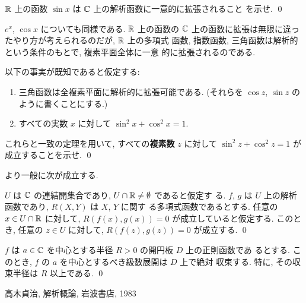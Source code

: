\documentclass[12pt,twoside]{jarticle}
\begin{document}
\begin{question}
  ${\mathbb R}$ 上の函数 $\sin x$ は ${\mathbb C}$ 上の解析函数に一意的に拡張されること
  を示せ. \qed
\end{question}

\noindent $e^x$, $\cos x$ についても同様である. ${\mathbb R}$ 上の函数の ${\mathbb C}$ 
上の函数に拡張は無限に違ったやり方が考えられるのだが, ${\mathbb R}$ 上の多項式
函数, 指数函数, 三角函数は解析的という条件のもとで, 複素平面全体に一意
的に拡張されるのである.

\begin{question}
  以下の事実が既知であると仮定する:
  \begin{enumerate}
  \item 三角函数は全複素平面に解析的に拡張可能である. %
    (それらを $\cos z$, $\sin z$ のように書くことにする.)
  \item すべての実数 $x$ に対して $\sin^2 x + \cos^2 x = 1$.
  \end{enumerate}
  これらと一致の定理を用いて, すべての{\bf 複素数} $z$ に対して 
  $\sin^2 z + \cos^2 z = 1$ が成立することを示せ. \qed
\end{question}

\noindent より一般に次が成立する.

\begin{question}
  $U$ は ${\mathbb C}$ の連結開集合であり, $U\cap{\mathbb R}\ne\emptyset$ であると仮定す
  る.  $f$, $g$ は $U$ 上の解析函数であり, $R(X,Y)$ は $X$, $Y$ に関す
  る多項式函数であるとする. 任意の $x\in U\cap{\mathbb R}$ に対して,
  $R(f(x),g(x))=0$ が成立していると仮定する. このとき, 任意の $z\in U$ 
  に対して, $R(f(z),g(z))=0$ が成立する. \qed
\end{question}

\begin{question}
  $f$ は $a\in{\mathbb C}$ を中心とする半径 $R>0$ の開円板 $D$ 上の正則函数であ
  るとする. このとき, $f$ の $a$ を中心とするべき級数展開は $D$ 上で絶対
  収束する. 特に, その収束半径は $R$ 以上である. \qed
\end{question}


\begin{thebibliography}{AB}

高木貞治, 解析概論, 岩波書店, 1983

\end{thebibliography}

\end{document}
